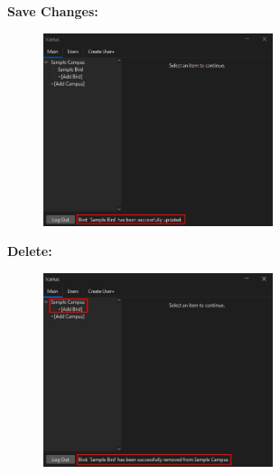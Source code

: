 \begin{enumerate}
    \textbf{Save Changes:}
    \begin{figure}[H]
        \centering
        \includegraphics[width=0.6\textwidth]{MainTab/EditBird/saveChanges.PNG}
    \end{figure}

    \textbf{Delete:}
    \begin{figure}[H]
        \centering
        \includegraphics[width=0.6\textwidth]{MainTab/EditBird/deleteBird.PNG}
    \end{figure}
    

    
\end{enumerate}
